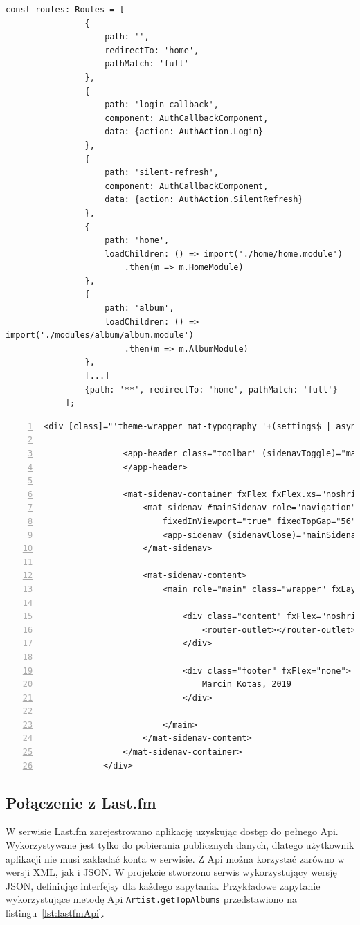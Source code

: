 		\begin{lstlisting}[label=lst:routing, caption=Trasy głównego modułu]
			const routes: Routes = [
				{
					path: '',
					redirectTo: 'home',
					pathMatch: 'full'
				},
				{
					path: 'login-callback',
					component: AuthCallbackComponent,
					data: {action: AuthAction.Login}
				},
				{
					path: 'silent-refresh',
					component: AuthCallbackComponent,
					data: {action: AuthAction.SilentRefresh}
				},
				{
					path: 'home',
					loadChildren: () => import('./home/home.module')
						.then(m => m.HomeModule)
				},
				{
					path: 'album',
					loadChildren: () => import('./modules/album/album.module')
						.then(m => m.AlbumModule)
				},
				[...]
				{path: '**', redirectTo: 'home', pathMatch: 'full'}
			];
		\end{lstlisting}

		\begin{lstlisting}[label=lst:appComponent, caption=Główny szablon HTML aplikacji, numbers=left, numberstyle=\tiny, stepnumber=2, float]
			<div [class]="'theme-wrapper mat-typography '+(settings$ | async)?.theme">

				<app-header class="toolbar" (sidenavToggle)="mainSidenav.toggle()">
				</app-header>
			
				<mat-sidenav-container fxFlex fxFlex.xs="noshrink">
					<mat-sidenav #mainSidenav role="navigation" mode="over"
						fixedInViewport="true" fixedTopGap="56">
						<app-sidenav (sidenavClose)="mainSidenav.close()"></app-sidenav>
					</mat-sidenav>
			
					<mat-sidenav-content>
						<main role="main" class="wrapper" fxLayout="column">
			
							<div class="content" fxFlex="noshrink">
								<router-outlet></router-outlet>
							</div>
			
							<div class="footer" fxFlex="none">
								Marcin Kotas, 2019
							</div>
			
						</main>
					</mat-sidenav-content>
				</mat-sidenav-container>
			</div>	
		\end{lstlisting}

	\subsection{Połączenie z Last.fm}
		W serwisie Last.fm zarejestrowano aplikację uzyskując dostęp do pełnego Api.
		Wykorzystywane jest tylko do pobierania publicznych danych, dlatego użytkownik aplikacji nie musi zakładać konta w serwisie.
		Z Api można korzystać zarówno w wersji XML, jak i JSON.
		W projekcie stworzono serwis wykorzystujący wersję JSON, definiując interfejsy dla każdego zapytania.
		Przykładowe zapytanie wykorzystujące metodę Api \verb|Artist.getTopAlbums| przedstawiono na listingu~\ref{lst:lastfmApi}.

